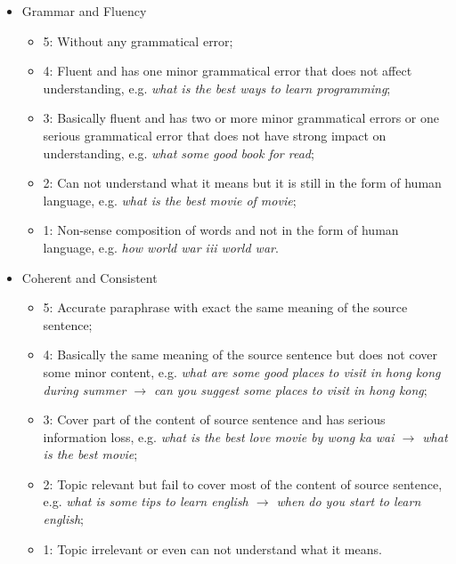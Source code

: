 \documentclass[11pt,a4paper]{article}
\begin{document}
    \begin{itemize}
      \item Grammar and Fluency
        \begin{itemize}
          \item 5: Without any grammatical error;
          \item 4: Fluent and has one minor grammatical error that does not affect understanding, e.g. \textit{what is the best ways to learn programming};
          \item 3: Basically fluent and has two or more minor grammatical errors or one serious grammatical error that does not have strong impact on understanding, e.g. \textit{what some good book for read};
          \item 2: Can not understand what it means but it is still in the form of human language, e.g. \textit{what is the best movie of movie};
          \item 1: Non-sense composition of words and not in the form of human language, e.g. \textit{how world war iii world war}.
        \end{itemize}
      \item Coherent and Consistent
        \begin{itemize}
          \item 5: Accurate paraphrase with exact the same meaning of the source sentence;
          \item 4: Basically the same meaning of the source sentence but does not cover some minor content, e.g. \textit{what are some good places to visit in hong kong during summer $\rightarrow$ can you suggest some places to visit in hong kong};
          \item 3: Cover part of the content of source sentence and has serious information loss, e.g. \textit{what is the best love movie by wong ka wai $\rightarrow$ what is the best movie};
          \item 2: Topic relevant but fail to cover most of the content of source sentence, e.g. \textit{what is some tips to learn english $\rightarrow$ when do you start to learn english};
          \item 1: Topic irrelevant or even can not understand what it means.
        \end{itemize}
    \end{itemize}
\end{document}
